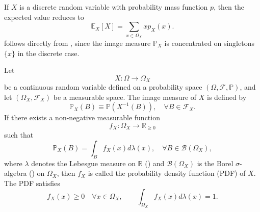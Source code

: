 \begin{remark}
	\label{rem:expected_value_discrete}
	If $X$ is a discrete random variable with probability mass function $p$, then the expected value reduces to
	\begin{equation}
		\mathbb{E}_X[X]=\sum_{x\in \Omega_X} x p_X(x).
		\label{eq:discrete_exp}
	\end{equation}
	 follows directly from , since the image measure $\mathbb{P}_X$ is concentrated on singletons $\{x\}$ in the discrete case.
\end{remark}

\begin{definition}
	\label{def:pdf}
	Let 
	\begin{equation}
		X: \Omega \to \Omega_X
	\end{equation} 
	be a continuous random variable defined on a probability space $(\Omega, \mathcal{F}, \mathbb{P})$, and let $(\Omega_X, \mathcal{F}_X)$ be a measurable space. The image measure of $X$ is defined by
	\begin{equation}
		\mathbb{P}_X(B) \equiv \mathbb{P}(X^{-1}(B)), \quad \forall B \in \mathcal{F}_X.
	\end{equation}
	If there exists a non-negative measurable function
	\begin{equation}
		f_X: \Omega_X \to \mathbb{R}_{\ge 0}
	\end{equation} 
	such that
	\begin{equation}
		\mathbb{P}_X(B) = \int_B f_X(x) d\lambda(x), \quad \forall B \in \mathcal{B}(\Omega_X),
	\end{equation}
	where $\lambda$ denotes the Lebesgue measure on $\mathbb{R}$ () and $\mathcal{B}(\Omega_X)$ is the Borel $\sigma$-algebra () on $\Omega_X$, then $f_X$ is called the probability density function (PDF) of $X$. The PDF satisfies
	\begin{equation}
		f_X(x) \ge 0 \quad \forall x \in \Omega_X, \qquad 
		\int_{\Omega_X} f_X(x) d\lambda(x) = 1.
	\end{equation}
\end{definition}

